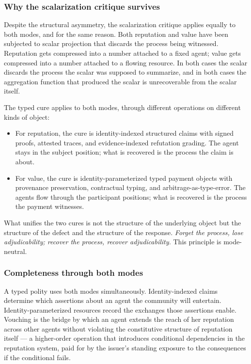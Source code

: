 \documentclass[11pt]{article}
\begin{document}
\subsubsection*{Why the scalarization critique survives}

Despite the structural asymmetry, the scalarization critique applies equally to both modes, and for the same reason. Both reputation and value have been subjected to scalar projection that discards the process being witnessed. Reputation gets compressed into a number attached to a fixed agent; value gets compressed into a number attached to a flowing resource. In both cases the scalar discards the process the scalar was supposed to summarize, and in both cases the aggregation function that produced the scalar is unrecoverable from the scalar itself.

The typed cure applies to both modes, through different operations on different kinds of object:

\begin{itemize}[leftmargin=*]
\item For reputation, the cure is identity-indexed structured claims with signed proofs, attested traces, and evidence-indexed refutation grading. The agent stays in the subject position; what is recovered is the process the claim is about.
\item For value, the cure is identity-parameterized typed payment objects with provenance preservation, contractual typing, and arbitrage-as-type-error. The agents flow through the participant positions; what is recovered is the process the payment witnesses.
\end{itemize}

What unifies the two cures is not the structure of the underlying object but the structure of the defect and the structure of the response. \emph{Forget the process, lose adjudicability; recover the process, recover adjudicability.} This principle is mode-neutral.

\subsubsection*{Completeness through both modes}

A typed polity uses both modes simultaneously. Identity-indexed claims determine which assertions about an agent the community will entertain. Identity-parameterized resources record the exchanges those assertions enable. Vouching is the bridge by which an agent extends the reach of her reputation across other agents without violating the constitutive structure of reputation itself --- a higher-order operation that introduces conditional dependencies in the reputation system, paid for by the issuer's standing exposure to the consequences if the conditional fails.
\end{document}
